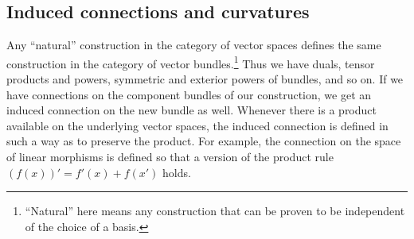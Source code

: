 \documentclass[11pt]{article}
\begin{document}
\subsection{Induced connections and curvatures}
\label{sec:induced-connections}

Any ``natural'' construction in the category of vector spaces defines the same construction in the category of vector bundles.\footnote{``Natural'' here means any construction that can be proven to be independent of the choice of a basis.} Thus we have duals, tensor products and powers, symmetric and exterior powers of bundles, and so on. If we have connections on the component bundles of our construction, we get an induced connection on the new bundle as well. Whenever there is a product available on the underlying vector spaces, the induced connection is defined in such a way as to preserve the product. For example, the connection on the space of linear morphisms is defined so that a version of the product rule $(f(x))' = f'(x) + f(x')$ holds.
\end{document}
